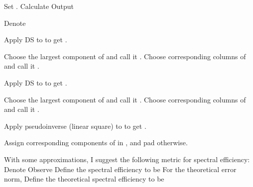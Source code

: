 {
\I Set .
\I Calculate
\I Output 
}
{
\I Denote

\I Apply DS to  to get .

\I Choose the  largest component of  and call it .
Choose corresponding columns of  and call it .
}
{
\I Apply DS to  to get .

\I Choose the  largest component of  and call it .
Choose corresponding columns of  and call it .

\I Apply pseudoinverse (linear square) to  to get .

\I Assign corresponding components of  in , and pad  otherwise.
}
{
\I With some approximations, I suggest the following metric for spectral efficiency:
\I Denote 
\I Observe
\I Define the spectral efficiency to be
}
{
\I For the theoretical error norm,
\I Define the theoretical spectral efficiency to be
}
